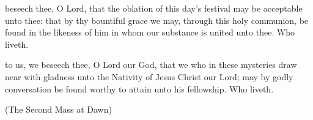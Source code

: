 \secret
{} beseech thee, O Lord, that the oblation of this day's festival may be acceptable unto thee: that by thy bountiful grace we may, through this holy communion, be found in the likeness of him in whom our substance is united unto thee. Who liveth.

\postcommunion
{} to us, we beseech thee, O Lord our God, that we who in these mysteries draw near with gladness unto the Nativity of Jesus Christ our Lord; may by godly conversation be found worthy to attain unto his fellowship. Who liveth.


\centerline{\small{(The Second Mass at Dawn)}}

